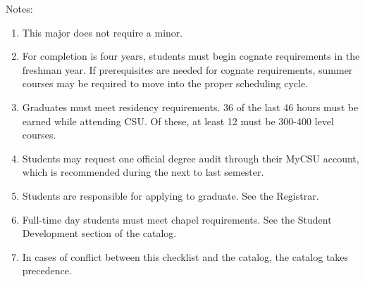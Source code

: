 Notes:%
\begin{enumerate}\footnotesize
	\item This major does not require a minor.
	\item For completion is four years, students must begin cognate requirements in the freshman year. If prerequisites are needed for cognate requirements, summer courses may be required to move into the proper scheduling cycle.
	\item Graduates must meet residency requirements. 36 of the last 46 hours must be earned while attending CSU. Of these, at least 12 must be 300-400 level courses.
	\item Students may request one official degree audit through their MyCSU account, which is recommended during the next to last semester.
	\item Students are responsible for applying to graduate. See the Registrar.
	\item Full-time day students must meet chapel requirements. See the Student Development section of the catalog.
	\item In cases of conflict between this checklist and the catalog, the catalog takes precedence.
\end{enumerate}
